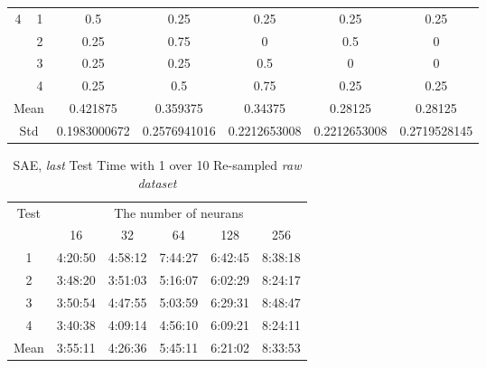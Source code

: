 \documentclass[draft,dvipsnames]{drexel-thesis}
\begin{document}
\begin{thesis}
\begin{table}[!t]
\begin{tabular}{|c|c|c|c|c|c|c|}
\multirow{4}{*}{4}    & 1                   & 0.5          & 0.25         & 0.25         & 0.25         & 0.25         \\ \cline{2-7}
                      & 2                   & 0.25         & 0.75         & 0            & 0.5          & 0            \\ \cline{2-7}
                      & 3                   & 0.25         & 0.25         & 0.5          & 0            & 0            \\ \cline{2-7}
                      & 4                   & 0.25         & 0.5          & 0.75         & 0.25         & 0.25         \\ \hline
\multicolumn{2}{|c|}{Mean}                  & 0.421875     & 0.359375     & 0.34375      & 0.28125      & 0.28125      \\ \hline
\multicolumn{2}{|c|}{Std}                   & 0.1983000672 & 0.2576941016 & 0.2212653008 & 0.2212653008 & 0.2719528145 \\ \hline
\end{tabular}
\end{table}

\begin{table}[!t]
\centering
\caption{SAE, {\em last} Test Time with 1 over 10 Re-sampled {\em raw dataset}}
\label{tbl:sae_last_1_10_time}
\begin{tabular}{|c|c|c|c|c|c|}
\hline
\multirow{2}{*}{Test} & \multicolumn{5}{c|}{The number of neurans}      \\ \cline{2-6}
                      & 16      & 32      & 64      & 128     & 256     \\ \hline
1                     & 4:20:50 & 4:58:12 & 7:44:27 & 6:42:45 & 8:38:18 \\ \hline
2                     & 3:48:20 & 3:51:03 & 5:16:07 & 6:02:29 & 8:24:17 \\ \hline
3                     & 3:50:54 & 4:47:55 & 5:03:59 & 6:29:31 & 8:48:47 \\ \hline
4                     & 3:40:38 & 4:09:14 & 4:56:10 & 6:09:21 & 8:24:11 \\ \hline
Mean                  & 3:55:11 & 4:26:36 & 5:45:11 & 6:21:02 & 8:33:53 \\ \hline
\end{tabular}
\end{table}



\end{thesis}
\end{document}
